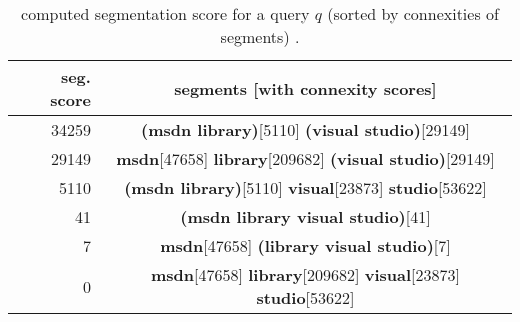 \begin{table}[t]
 \caption{computed segmentation score for a query $q$ (sorted by connexities of segments) \citep{Risvik:2003}.}
 \label{table-connexity-score-risvik-2003}
 \centering
 \small
 \begin{tabular}{@{}rc@{}}
  \toprule
  seg. score & segments [with connexity scores] \\
  \midrule
  34259      & \textbf{(msdn library)}[5110] \textbf{(visual studio)}[29149]  \\
  29149      & \textbf{msdn}[47658] \textbf{library}[209682] \textbf{(visual studio)}[29149]  \\
  5110       & \textbf{(msdn library)}[5110] \textbf{visual}[23873] \textbf{studio}[53622]  \\
  41      	 & \textbf{(msdn library visual studio)}[41]  \\
  7		     & \textbf{msdn}[47658] \textbf{(library visual studio)}[7]  \\
  0 		     & \textbf{msdn}[47658] \textbf{library}[209682] \textbf{visual}[23873] \textbf{studio}[53622]  \\
  \bottomrule
 \end{tabular}
\end{table}
